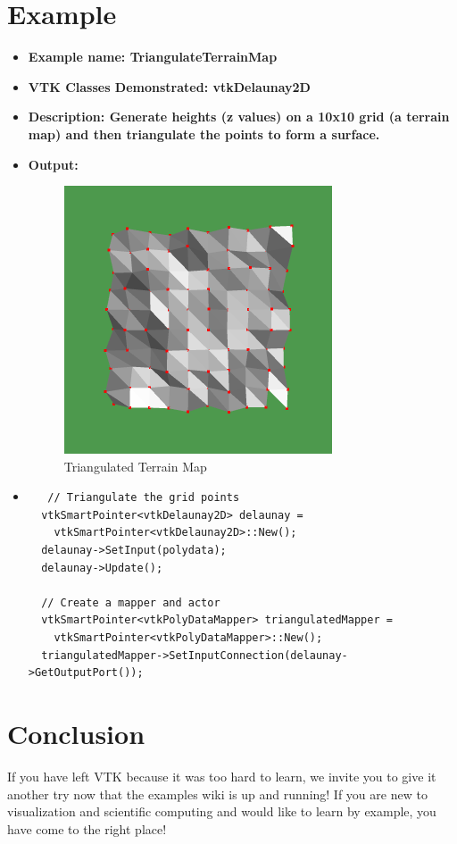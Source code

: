 \documentclass[a4paper,10pt]{IEEEtran}
\begin{document}
\section{Example}
\begin{itemize}
\item \bf{Example name:} TriangulateTerrainMap
\item \bf{VTK Classes Demonstrated:} vtkDelaunay2D
\item \bf{Description:} Generate heights (z values) on a 10x10 grid (a terrain map) and then triangulate the points to form a surface.
\item \bf{Output:}
\begin{figure}[H]
   \centering
   \includegraphics[width=0.4\linewidth]{TriangulateTerrainMap}
   \caption{Triangulated Terrain Map}
\end{figure}

\item 
\begin{verbatim}
   // Triangulate the grid points
  vtkSmartPointer<vtkDelaunay2D> delaunay =
    vtkSmartPointer<vtkDelaunay2D>::New();
  delaunay->SetInput(polydata);
  delaunay->Update();
 
  // Create a mapper and actor
  vtkSmartPointer<vtkPolyDataMapper> triangulatedMapper =
    vtkSmartPointer<vtkPolyDataMapper>::New();
  triangulatedMapper->SetInputConnection(delaunay->GetOutputPort());
\end{verbatim}
\end{itemize}




\section{Conclusion}
If you have left VTK because it was too hard to learn, we invite you to give it another try now that the examples wiki is up and running! If you are new to visualization and scientific computing and would like to learn by example, you have come to the right place!
\end{document}
